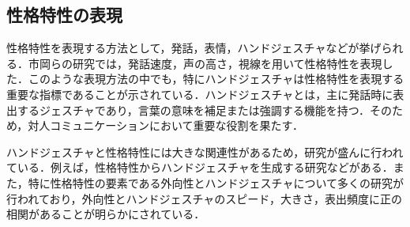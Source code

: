 \subsection{性格特性の表現}
\label{sec2.3.3}
性格特性を表現する方法として，発話，表情，ハンドジェスチャなどが挙げられる．市岡らの研究では，発話速度，声の高さ，視線を用いて性格特性を表現した\cite{対人親和性}．このような表現方法の中でも，特にハンドジェスチャは性格特性を表現する重要な指標であることが示されている\cite{ハンドジェスチャ指標1}\cite{ハンドジェスチャ指標2}\cite{ハンドジェスチャ指標3}．ハンドジェスチャとは，主に発話時に表出するジェスチャであり，言葉の意味を補足または強調する機能を持つ\cite{ハンドジェスチャ強調}．そのため，対人コミュニケーションにおいて重要な役割を果たす．

ハンドジェスチャと性格特性には大きな関連性があるため，研究が盛んに行われている．例えば，性格特性からハンドジェスチャを生成する研究などがある\cite{ジェスチャ生成}．また，特に性格特性の要素である外向性とハンドジェスチャについて多くの研究が行われており，外向性とハンドジェスチャのスピード，大きさ，表出頻度に正の相関があることが明らかにされている\cite{ハンドジェスチャ指標1}\cite{ハンドジェスチャ指標3}\cite{ハンドジェスチャ外向性}．








\vspace{1cm}
\begin{figure}[!h]
 \begin{center}
  \centering
  \label{fig:kansei}
 \end{center}
\end{figure}

